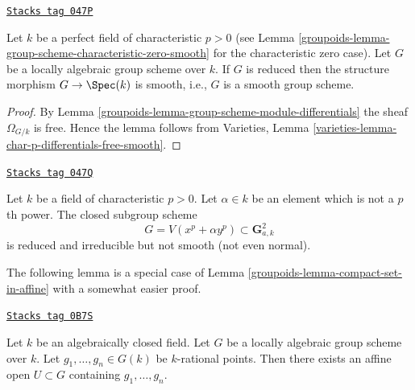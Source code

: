 \begin{lemma}
\label{groupoids-lemma-reduced-group-scheme-prefect-field-characteristic-p-smooth}
\href{https://stacks.math.columbia.edu/tag/047P}{\texttt{Stacks tag 047P}}

Let $k$ be a perfect field of characteristic $p > 0$ (see
Lemma \ref{groupoids-lemma-group-scheme-characteristic-zero-smooth}
for the characteristic zero case).
Let $G$ be a locally algebraic group scheme over $k$.
If $G$ is reduced then the structure
morphism $G \to \Spec(k)$ is smooth, i.e., $G$ is a smooth
group scheme.
\end{lemma}

\begin{proof}

By
Lemma \ref{groupoids-lemma-group-scheme-module-differentials}
the sheaf $\Omega_{G/k}$ is free. Hence the lemma follows from
Varieties, Lemma \ref{varieties-lemma-char-p-differentials-free-smooth}.
\end{proof}

\begin{remark}
\label{groupoids-remark-reduced-smooth-not-true-general}
\href{https://stacks.math.columbia.edu/tag/047Q}{\texttt{Stacks tag 047Q}}

Let $k$ be a field of characteristic $p > 0$.
Let $\alpha \in k$ be an element which is not a $p$th power.
The closed subgroup scheme
$$
G = V(x^p + \alpha y^p) \subset \mathbf{G}_{a, k}^2
$$
is reduced and irreducible but not smooth (not even normal).
\end{remark}

The following lemma is a special case of
Lemma \ref{groupoids-lemma-compact-set-in-affine}
with a somewhat easier proof.

\begin{lemma}
\label{groupoids-lemma-points-in-affine}
\href{https://stacks.math.columbia.edu/tag/0B7S}{\texttt{Stacks tag 0B7S}}

Let $k$ be an algebraically closed field.
Let $G$ be a locally algebraic group scheme over $k$.
Let $g_1, \ldots, g_n \in G(k)$ be $k$-rational points.
Then there exists an affine open $U \subset G$ containing $g_1, \ldots, g_n$.
\end{lemma}

